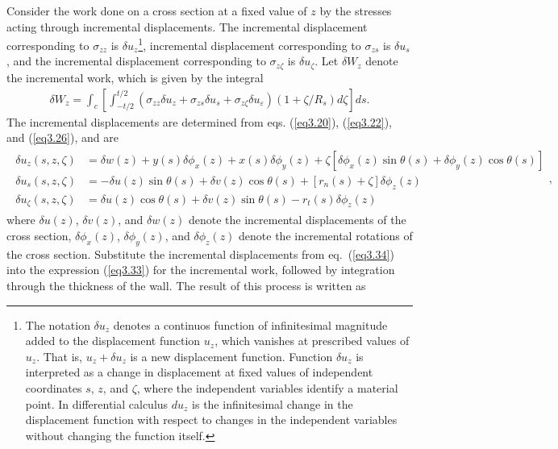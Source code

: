 \documentclass{AeroStructure-ERJohnson}
\begin{document}
Consider the work done on a cross section at a fixed value of $z$ by the stresses acting through incremental displacements. The incremental displacement corresponding to $\sigma_{z z}$ is $\delta u_{z}$\footnote{The notation $\delta u_z$ denotes a continuos function of infinitesimal magnitude added to the displacement function $u_z$, which vanishes at prescribed values of $u_z$. That is, $u_z+\delta u_z$ is a new displacement function. Function $\delta u_z$ is interpreted as a change in displacement at fixed values of independent coordinates $s$, $z$, and $\zeta$, where the independent variables identify a material point. In differential calculus $d u_z$ is the infinitesimal change in the displacement function with respect to changes in the independent variables without changing the function itself.}, incremental displacement corresponding to $\sigma_{z s}$ is $\delta u_{s}$, and the incremental displacement corresponding to $\sigma_{z \zeta}$ is $\delta u_{\zeta}$. Let $\delta W_{z}$ denote the incremental work, which is given by the integral
\begin{align}\label{eq3.33}
\delta W_{z}=\int_{c}\left[\int_{-t / 2}^{t / 2}\left(\sigma_{z z} \delta u_{z}+\sigma_{z s} \delta u_{s}+\sigma_{z \zeta} \delta u_{\varepsilon}\right)\left(1+\zeta / R_{s}\right) d \zeta\right] d s.
\end{align}
The incremental displacements are determined from eqs. (\ref{eq3.20}), (\ref{eq3.22}), and (\ref{eq3.26}), and are
\begin{align}\label{eq3.34}
\begin{split}
\delta u_{z}(s, z, \zeta)&=\delta w(z)+y(s) \delta \phi_{x}(z)+x(s) \delta \phi_{y}(z)+\zeta\left[\delta \phi_{x}(z) \sin \theta(s)+\delta \phi_{y}(z) \cos \theta(s)\right] \\
\delta u_{s}(s, z, \zeta)&=-\delta u(z) \sin \theta(s)+\delta v(z) \cos \theta(s)+\left[r_{n}(s)+\zeta\right] \delta \phi_{z}(z) \\
\delta u_{\zeta}(s, z, \zeta)&=\delta u(z) \cos \theta(s)+\delta v(z) \sin \theta(s)-r_{t}(s) \delta \phi_{z}(z)
\end{split},
\end{align}
where $\delta u(z)$, $\delta v(z)$, and $\delta w(z)$ denote the incremental displacements of the cross section, $\delta \phi_{x}(z)$, $\delta \phi_{y}(z)$, and $\delta \phi_{z}(z)$ denote the incremental rotations of the cross section. Substitute the incremental displacements from eq.~(\ref{eq3.34}) into the expression (\ref{eq3.33}) for the incremental work, followed by integration through the thickness of the wall. The result of this process is written as
\end{document}
